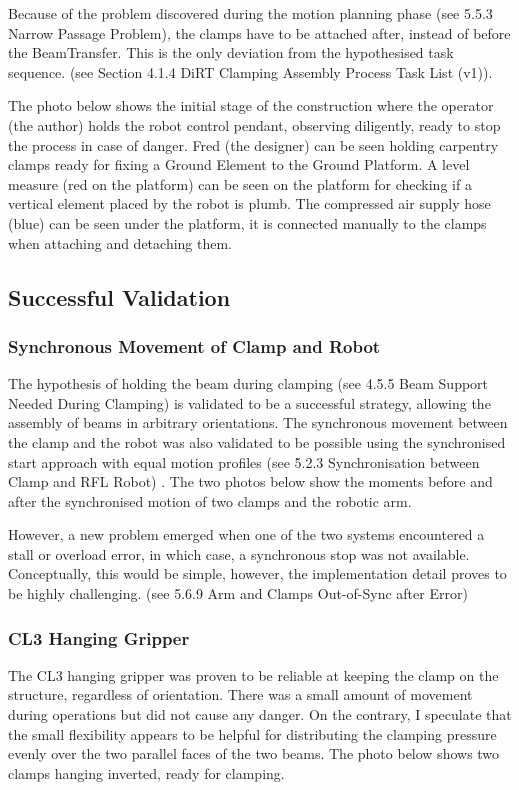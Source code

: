 Because of the problem discovered during the motion planning phase (see 5.5.3 Narrow Passage Problem), the clamps have to be attached after, instead of before the BeamTransfer. This is the only deviation from the hypothesised task sequence. (see Section 4.1.4 DiRT Clamping Assembly Process Task List (v1)). 

The photo below shows the initial stage of the construction where the operator (the author) holds the robot control pendant, observing diligently, ready to stop the process in case of danger. Fred (the designer) can be seen holding carpentry clamps ready for fixing a Ground Element to the Ground Platform. A level measure (red on the platform) can be seen on the platform for checking if a vertical element placed by the robot is plumb. The compressed air supply hose (blue) can be seen under the platform, it is connected manually to the clamps when attaching and detaching them.

\subsection{Successful Validation}
\subsubsection{Synchronous Movement of Clamp and Robot}

The hypothesis of holding the beam during clamping (see 4.5.5 Beam Support Needed During Clamping) is validated to be a successful strategy, allowing the assembly of beams in arbitrary orientations. The synchronous movement between the clamp and the robot was also validated to be possible using the synchronised start approach with equal motion profiles (see 5.2.3 Synchronisation between Clamp and RFL Robot) . The two photos below show the moments before and after the synchronised motion of two clamps and the robotic arm.
 
However, a new problem emerged when one of the two systems encountered a stall or overload error, in which case, a synchronous stop was not available. Conceptually, this would be simple, however, the implementation detail proves to be highly challenging. (see 5.6.9 Arm and Clamps Out-of-Sync after Error)
\subsubsection{CL3 Hanging Gripper}

The CL3 hanging gripper was proven to be reliable at keeping the clamp on the structure, regardless of orientation. There was a small amount of movement during operations but did not cause any danger. On the contrary, I speculate that the small flexibility appears to be helpful for distributing the clamping pressure evenly over the two parallel faces of the two beams.  The photo below shows two clamps hanging inverted, ready for clamping.


